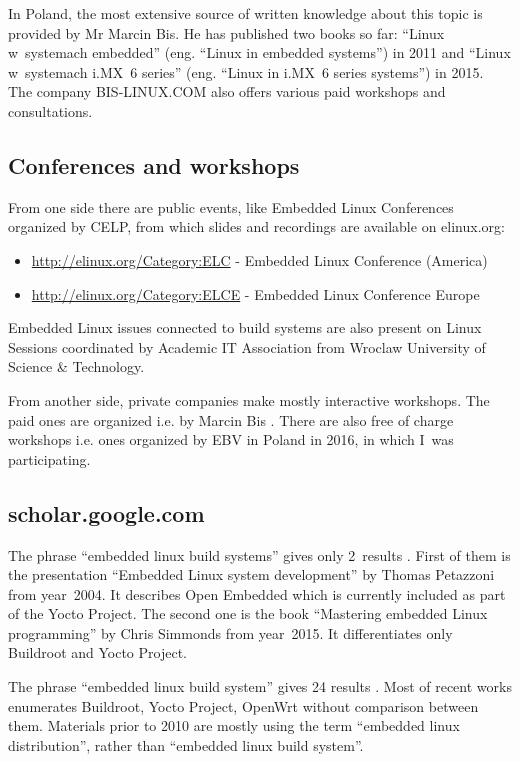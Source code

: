\documentclass[printmode]{mgr}
\begin{document}
In Poland, the most extensive source of written knowledge about this topic is provided by Mr Marcin Bis.
He has published two books so far: ``Linux w~systemach embedded'' (eng. ``Linux in embedded systems'') in 2011 and ``Linux w~systemach i.MX~6 series'' (eng. ``Linux in i.MX~6 series systems'') in 2015.
The company BIS-LINUX.COM also offers various paid workshops and consultations.

\subsection*{Conferences and workshops}

From one side there are public events, like Embedded Linux Conferences organized by CELP, from which slides and recordings are available on elinux.org:

\begin{itemize}
  \item \url{http://elinux.org/Category:ELC} - Embedded Linux Conference (America)
  \item \url{http://elinux.org/Category:ELCE} - Embedded Linux Conference Europe
\end{itemize}

Embedded Linux issues connected to build systems are also present on Linux Sessions \cite{web:sesja-linuksowa} coordinated by Academic IT Association from Wroclaw University of Science \& Technology.

From another side, private companies make mostly interactive workshops. The paid ones are organized i.e. by Marcin Bis \cite{web:bis-szkolenia}. There are also free of charge workshops i.e. ones organized by EBV in Poland in 2016, in which I~was participating.

\subsection*{scholar.google.com}
The phrase ``embedded linux build systems'' gives only 2~results  \cite{web:scholar-1}. First of them is the presentation ``Embedded Linux system development'' by Thomas Petazzoni from year~2004. It describes Open Embedded which is currently included as part of the Yocto Project. The second one is the book ``Mastering embedded Linux programming'' by Chris Simmonds from year~2015. It differentiates only Buildroot and Yocto Project.

The phrase ``embedded linux build system'' gives 24 results \cite{web:scholar-2}. Most of recent works enumerates Buildroot, Yocto Project, OpenWrt without comparison between them. Materials prior to 2010 are mostly using the term ``embedded linux distribution'', rather than ``embedded linux build system''.
\end{document}
